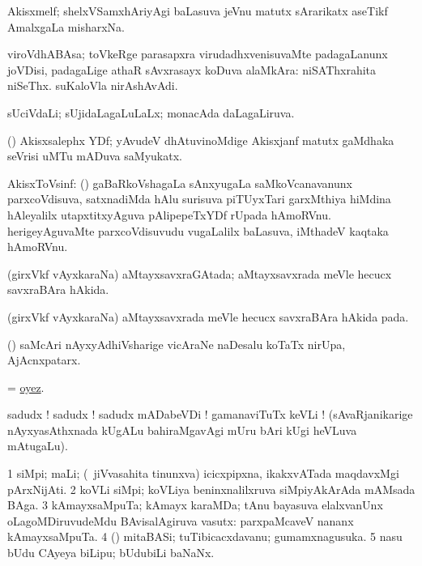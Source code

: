 \bentry
{}
\gl{\nA}
\bmng
Akisxmelf; shelxVSamxhAriyAgi baLasuva jeVnu matutx sArarikatx aseTikf AmalxgaLa misharxNa. 
\emng
\eentry

\bentry
{}
\gl{\nA}
\bmng
viroVdhABAsa; toVkeRge parasapxra virudadhxvenisuvaMte padagaLanunx joVDisi, padagaLige athaR sAvxrasayx koDuva alaMkAra:  niSAThxrahita niSeThx.  suKaloVla nirAshAvAdi. 
\emng
\eentry

\bentry
{}
\gl{\gu}
\bmng
sUciVdaLi; sUjidaLagaLuLaLx; monacAda daLagaLiruva. 
\emng
\eentry

\bentry
{}
\gl{\nA}
\bmng
(\ravi) Akisxsalephx YDf; yAvudeV dhAtuvinoMdige Akisxjanf matutx gaMdhaka seVrisi uMTu mADuva saMyukatx. 
\emng
\eentry

\bentry
{}
\gl{\nA}
\bmng
AkisxToVsinf: 
\banum
{} (\jiVra) gaBaRkoVshagaLa sAnxyugaLa saMkoVcanavanunx parxcoVdisuva, satxnadiMda hAlu surisuva piTUyxTari garxMthiya hiMdina hAleyalilx utapxtitxyAguva pAlipepeTxYDf rUpada hAmoRVnu. 
 herigeyAguvaMte parxcoVdisuvudu \mo vugaLalilx baLasuva, iMthadeV kaqtaka hAmoRVnu. 
\eanum
\emng
\eentry

\bentry
{}
\gl{\gu}
\bmng
(girxVkf vAyxkaraNa) aMtayxsavxraGAtada; aMtayxsavxrada meVle hecucx savxraBAra hAkida. 
\emng
\eentry

\bentry
{}
\gl{\nA}
\bmng
(girxVkf vAyxkaraNa) aMtayxsavxrada meVle hecucx savxraBAra hAkida pada. 
\emng
\eentry

\bentry
{}
\gl{\nA}
\bmng
(\ca) saMcAri nAyxyAdhiVsharige vicAraNe naDesalu koTaTx nirUpa, AjAcnxpatarx. 
\emng
\eentry

\bentry
{}
\gl{\BAavayx}
\bmng
= \hyperlink{oyez}{oyez}. 
\emng
\eentry

\bentry
{}
\gl{\BAavayx}
\bmng
sadudx ! sadudx ! sadudx mADabeVDi ! gamanaviTuTx keVLi ! (sAvaRjanikarige nAyxyasAthxnada kUgALu bahiraMgavAgi mUru bAri kUgi heVLuva mAtugaLu). 
\emng
\eentry

\bentry
{}
\gl{\nA}
\bmng
\bnum
\num{1} siMpi; maLi; (\sA\ jiVvasahita tinunxva) icicxpipxna, ikakxvATada maqdavxMgi pArxNijAti.  
\num{2} koVLi siMpi; koVLiya beninxnalilxruva siMpiyAkArAda mAMsada BAga. 
\num{3} kAmayxsaMpuTa; kAmayx karaMDa; tAnu bayasuva elalxvanUnx oLagoMDiruvudeMdu BAvisalAgiruva vasutx:  parxpaMcaveV nananx kAmayxsaMpuTa. 
\num{4} (\ashi) mitaBASi; tuTibicacxdavanu; gumamxnagusuka. 
\num{5} nasu bUdu CAyeya biLipu; bUdubiLi baNaNx. 
\enum
\emng
\eentry


